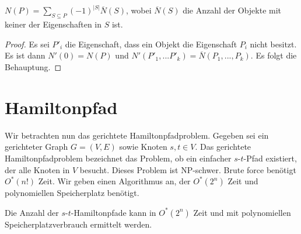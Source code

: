   
  \begin{corollary}
    \(N(P) = \sum_{S \subseteq P} (-1)^{|S|}\overline{N}(S)\), wobei \(\overline{N}(S)\) die Anzahl der Objekte mit keiner der Eigenschaften in \(S\) ist.
  \end{corollary}
  
  \begin{proof}
    Es sei \(P'_i\) die Eigenschaft, dass ein Objekt die Eigenschaft \(P_i\) nicht besitzt. Es ist dann \(N'(0) = N(P)\) und \(N'(P'_1, ... P'_k) = \overline{N}(P_1,...,P_k)\). Es folgt die Behauptung.
  \end{proof}
  
\section{Hamiltonpfad}
  Wir betrachten nun das gerichtete Hamiltonpfadproblem. Gegeben sei ein gerichteter Graph \(G = (V,E)\) sowie Knoten \(s,t \in V\). Das gerichtete Hamiltonpfadproblem bezeichnet das Problem, ob ein einfacher \(s\)-\(t\)-Pfad existiert, der alle Knoten in \(V\) besucht. Dieses Problem ist NP-schwer. Brute force benötigt \(O^*(n!)\) Zeit. Wir geben einen Algorithmus an, der \(O^*(2^n)\) Zeit und polynomiellen Speicherplatz benötigt.
  
  \begin{theorem}
    Die Anzahl der \(s\)-\(t\)-Hamiltonpfade kann in \(O^*(2^n)\) Zeit und mit polynomiellen Speicherplatzverbrauch ermittelt werden.
  \end{theorem}
  
